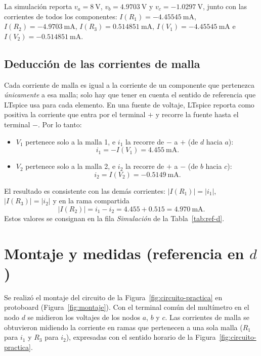 \documentclass[conference,10pt]{IEEEtran}
\begin{document}
La simulación reporta $v_a=8~\mathrm{V}$, $v_b=4.9703~\mathrm{V}$ y $v_c=-1.0297~\mathrm{V}$, junto con las corrientes de todos los componentes: $I(R_1)=-4.45545~\mathrm{mA}$, $I(R_2)=-4.9703~\mathrm{mA}$, $I(R_3)=0.514851~\mathrm{mA}$, $I(V_1)=-4.45545~\mathrm{mA}$ e $I(V_2)=-0.514851~\mathrm{mA}$.

\subsection{Deducción de las corrientes de malla}
Cada corriente de malla es igual a la corriente de un componente que pertenezca \emph{únicamente} a esa malla; solo hay que tener en cuenta el sentido de referencia que LTspice usa para cada elemento. En una fuente de voltaje, LTspice reporta como positiva la corriente que entra por el terminal $+$ y recorre la fuente hasta el terminal $-$. Por lo tanto:
\begin{itemize}
  \item $V_1$ pertenece solo a la malla 1, e $i_1$ la recorre de $-$ a $+$ (de $d$ hacia $a$):
  \begin{equation*}
    i_1 = -I(V_1) = 4.455~\mathrm{mA}.
  \end{equation*}
  \item $V_2$ pertenece solo a la malla 2, e $i_2$ la recorre de $+$ a $-$ (de $b$ hacia $c$):
  \begin{equation*}
    i_2 = I(V_2) = -0.5149~\mathrm{mA}.
  \end{equation*}
\end{itemize}
El resultado es consistente con las demás corrientes: $|I(R_1)|=|i_1|$, $|I(R_3)|=|i_2|$ y en la rama compartida
\begin{equation*}
  |I(R_2)| = i_1 - i_2 = 4.455 + 0.515 = 4.970~\mathrm{mA}.
\end{equation*}
Estos valores se consignan en la fila \emph{Simulación} de la Tabla~\ref{tab:ref-d}.

\section{Montaje y medidas (referencia en $d$)}
\label{sec:montaje}
Se realizó el montaje del circuito de la Figura~\ref{fig:circuito-practica} en protoboard (Figura~\ref{fig:montaje}). Con el terminal común del multímetro en el nodo $d$ se midieron los voltajes de los nodos $a$, $b$ y $c$. Las corrientes de malla se obtuvieron midiendo la corriente en ramas que pertenecen a una sola malla ($R_1$ para $i_1$ y $R_3$ para $i_2$), expresadas con el sentido horario de la Figura~\ref{fig:circuito-practica}.
\end{document}
